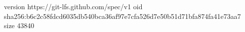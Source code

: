 version https://git-lfs.github.com/spec/v1
oid sha256:b6c2c58fdcd6035db540bca36af97e7cfa526d7e50b51d71bfa874fa41e73aa7
size 43840
